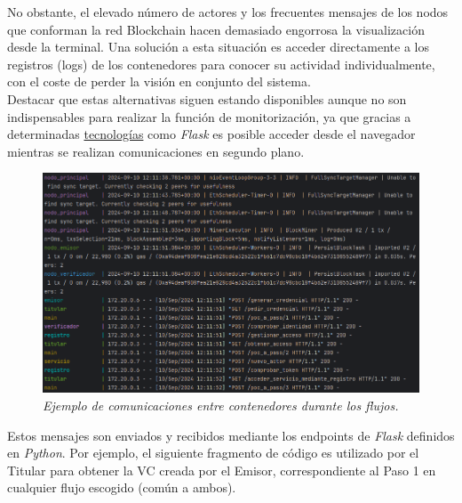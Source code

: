 \documentclass[../main.tex]{subfiles}
\begin{document}
\noindent No obstante, el elevado número de actores y los frecuentes mensajes de los nodos que conforman la red Blockchain hacen demasiado engorrosa la visualización desde la terminal. Una solución a esta situación es acceder directamente a los registros (logs) de los contenedores para conocer su actividad individualmente, con el coste de perder la visión en conjunto del sistema. 
\\

\noindent Destacar que estas alternativas siguen estando disponibles aunque no son indispensables para realizar la función de monitorización, ya que gracias a determinadas \hyperref[Análisis sobre las tecnologías empleadas]{tecnologías} como \textit{Flask} es posible acceder desde el navegador mientras se realizan comunicaciones en segundo plano. 
\\

\begin{figure}[htbp]
    \centering
    \includegraphics[width=1\linewidth]{images/design/comunicaciones.png}
    \caption{\textit{Ejemplo de comunicaciones entre contenedores durante los flujos.}}
\end{figure}

\newpage
\noindent Estos mensajes son enviados y recibidos mediante los endpoints de \textit{Flask} definidos en \textit{Python}. Por ejemplo, el siguiente fragmento de código es utilizado por el Titular para obtener la \acrshort{VC} creada por el Emisor, correspondiente al Paso 1 en cualquier flujo escogido (común a ambos). 
\end{document}
